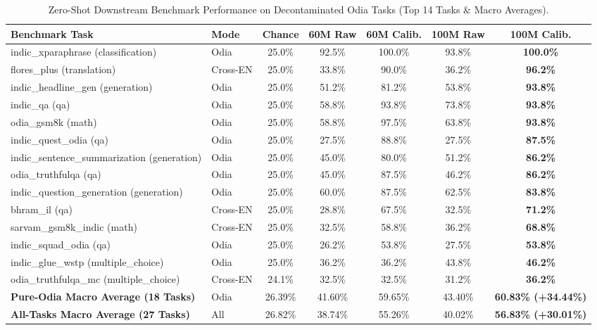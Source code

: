 \documentclass[10pt,twocolumn,letterpaper]{article}
\begin{document}
\begin{table}[t]
\centering
\small
\caption{Zero-Shot Downstream Benchmark Performance on Decontaminated Odia Tasks (Top 14 Tasks \& Macro Averages).}
\label{tab:benchmarks}
\begin{tabular}{llccccc}
\toprule
\textbf{Benchmark Task} & \textbf{Mode} & \textbf{Chance} & \textbf{60M Raw} & \textbf{60M Calib.} & \textbf{100M Raw} & \textbf{100M Calib.} \\
\midrule
indic\_xparaphrase (classification) & Odia & 25.0\% & 92.5\% & 100.0\% & 93.8\% & \textbf{100.0\%} \\
flores\_plus (translation) & Cross-EN & 25.0\% & 33.8\% & 90.0\% & 36.2\% & \textbf{96.2\%} \\
indic\_headline\_gen (generation) & Odia & 25.0\% & 51.2\% & 81.2\% & 53.8\% & \textbf{93.8\%} \\
indic\_qa (qa) & Odia & 25.0\% & 58.8\% & 93.8\% & 73.8\% & \textbf{93.8\%} \\
odia\_gsm8k (math) & Odia & 25.0\% & 58.8\% & 97.5\% & 63.8\% & \textbf{93.8\%} \\
indic\_quest\_odia (qa) & Odia & 25.0\% & 27.5\% & 88.8\% & 27.5\% & \textbf{87.5\%} \\
indic\_sentence\_summarization (generation) & Odia & 25.0\% & 45.0\% & 80.0\% & 51.2\% & \textbf{86.2\%} \\
odia\_truthfulqa (qa) & Odia & 25.0\% & 45.0\% & 87.5\% & 46.2\% & \textbf{86.2\%} \\
indic\_question\_generation (generation) & Odia & 25.0\% & 60.0\% & 87.5\% & 62.5\% & \textbf{83.8\%} \\
bhram\_il (qa) & Cross-EN & 25.0\% & 28.8\% & 67.5\% & 32.5\% & \textbf{71.2\%} \\
sarvam\_gsm8k\_indic (math) & Cross-EN & 25.0\% & 32.5\% & 58.8\% & 36.2\% & \textbf{68.8\%} \\
indic\_squad\_odia (qa) & Odia & 25.0\% & 26.2\% & 53.8\% & 27.5\% & \textbf{53.8\%} \\
indic\_glue\_wstp (multiple\_choice) & Odia & 25.0\% & 36.2\% & 36.2\% & 43.8\% & \textbf{46.2\%} \\
odia\_truthfulqa\_mc (multiple\_choice) & Cross-EN & 24.1\% & 32.5\% & 32.5\% & 31.2\% & \textbf{36.2\%} \\
\midrule
\textbf{Pure-Odia Macro Average (18 Tasks)} & Odia & 26.39\% & 41.60\% & 59.65\% & 43.40\% & \textbf{60.83\% (+34.44\%)} \\
\textbf{All-Tasks Macro Average (27 Tasks)} & All & 26.82\% & 38.74\% & 55.26\% & 40.02\% & \textbf{56.83\% (+30.01\%)} \\
\bottomrule
\end{tabular}
\end{table}
\end{document}
